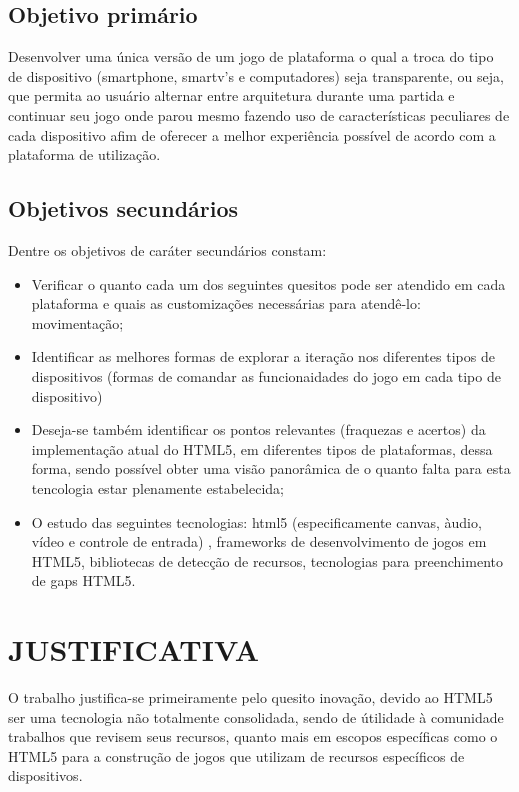 \documentclass{article}
\begin{document}
\subsection{Objetivo primário}

Desenvolver uma única versão de um jogo de plataforma o qual a troca do tipo de dispositivo (smartphone, smartv's e computadores) seja transparente, ou seja, que  permita ao usuário alternar entre arquitetura durante uma partida e continuar seu jogo onde parou mesmo fazendo uso de características peculiares de cada dispositivo afim de oferecer a melhor experiência possível de acordo com a plataforma de utilização.

\subsection{Objetivos secundários}

Dentre os objetivos de caráter secundários constam:

\begin{itemize}
\item Verificar o quanto cada um dos seguintes quesitos pode ser atendido em cada plataforma e quais as customizações necessárias para atendê-lo: movimentação;
\item Identificar as melhores formas de explorar a iteração nos diferentes tipos de dispositivos (formas de comandar as funcionaidades do jogo em cada tipo de dispositivo)
\item Deseja-se também identificar os pontos relevantes (fraquezas e acertos) da implementação atual do HTML5, em diferentes tipos de plataformas, dessa forma, sendo possível obter uma visão panorâmica de o quanto falta para esta tencologia estar plenamente estabelecida;
\item O estudo das seguintes tecnologias: html5 (especificamente canvas, àudio, vídeo e controle de entrada) , frameworks de desenvolvimento de jogos em HTML5, bibliotecas de detecção de recursos, tecnologias para preenchimento de gaps HTML5.
\end{itemize}

\section{JUSTIFICATIVA}

O trabalho justifica-se primeiramente pelo quesito inovação, devido ao HTML5 ser uma tecnologia não totalmente consolidada, sendo de útilidade à comunidade trabalhos que revisem seus recursos, quanto mais em escopos específicas como o HTML5 para a construção de jogos que utilizam de recursos específicos de dispositivos.
\end{document}
